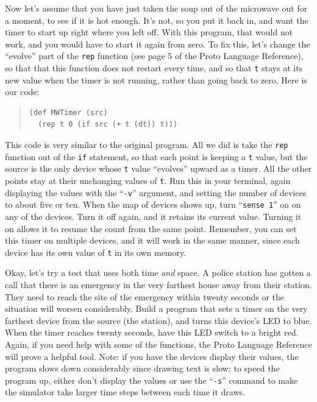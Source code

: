 \documentclass{article}
\newcommand\var[1]{{\tt #1}}
\newcommand\qvar[1]{``{\tt #1}''}
\begin{document}
Now let's assume that you have just taken the soup out of the
microwave out for a moment, to see if it is hot enough.  It's not, so
you put it back in, and want the timer to start up right where you
left off.  With this program, that would not work, and you would have
to start it again from zero.  To fix this, let's change the ``evolve''
part of the \var{rep} function (see page 5 of the Proto Language
Reference), so that that this function does not restart every time,
and so that \var{t} stays at its new value when the timer is not
running, rather than going back to zero. Here is our code:

\begin{quote}
\begin{verbatim}
(def MWTimer (src) 
  (rep t 0 (if src (+ t (dt)) t)))
\end{verbatim}
\end{quote}

This code is very similar to the original program. All we did is take
the \var{rep} function out of the \var{if} statement, so that each
point is keeping a \var{t} value, but the source is the only device
whose \var{t} value ``evolves'' upward as a timer.  All the other
points stay at their unchanging values of \var{t}.  Run this in your
terminal, again displaying the values with the \qvar{-v} argument, and
setting the number of devices to about five or ten.  When the map of
devices shows up, turn \qvar{sense 1} on on any of the devices.  Turn
it off again, and it retains its current value.  Turning it on allows
it to resume the count from the same point.  Remember, you can set
this timer on multiple devices, and it will work in the same manner,
since each device has its own value of \var{t} in its own memory.

Okay, let's try a test that uses both time {\em and} space.  A police
station has gotten a call that there is an emergency in the very
farthest house away from their station.  They need to reach the site
of the emergency within twenty seconds or the situation will worsen
considerably.  Build a program that sets a timer on the very farthest
device from the source (the station), and turns this device's LED to
blue.  When the timer reaches twenty seconds, have this LED switch to
a bright red.  Again, if you need help with some of the functions, the
Proto Language Reference will prove a helpful tool.  Note: if you have
the devices display their values, the program slows down considerably
since drawing text is slow; to speed the program up, either don't
display the values or use the \qvar{-s} command to make the simulator
take larger time steps between each time it draws.
\end{document}
